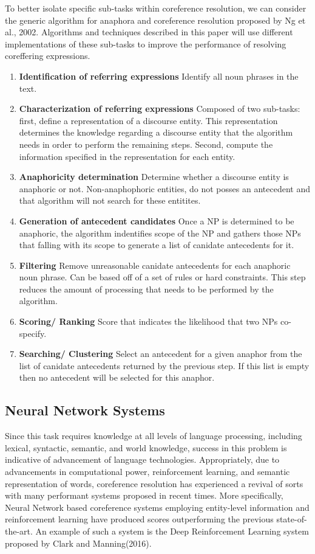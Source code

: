 \documentclass[11pt]{article}
\begin{document}
To better isolate specific sub-tasks within coreference resolution, we can consider the generic algorithm for anaphora and coreference resolution proposed by Ng et al., 2002. Algorithms and techniques described in this paper will use different implementations of these sub-tasks to improve the performance of resolving coreffering expressions. 
\begin{enumerate}
\item \textbf{Identification of referring expressions} Identify all noun phrases in the text. 
\item \textbf{Characterization of referring expressions} Composed of two sub-tasks: first, define a representation of a discourse entity. This representation determines the knowledge regarding a discourse entity that the algorithm needs in order to perform the remaining steps. Second, compute the information specified in the representation for each entity. 
\item \textbf{Anaphoricity determination} Determine whether a discourse entity is anaphoric or not. Non-anaphophoric entities, do not posses an antecedent and that algorithm will not search for these entitites. 
\item \textbf{Generation of antecedent candidates} Once a NP is determined to be anaphoric, the algorithm indentifies scope of the NP and gathers those NPs that falling with its scope to generate a list of canidate antecedents for it.
\item \textbf{Filtering} Remove unreasonable canidate antecedents for each anaphoric noun phrase. Can be based off of a set of rules or hard constraints. This step reduces the amount of processing that needs to be performed by the algorithm.
\item \textbf{Scoring/ Ranking} Score that indicates the likelihood that two NPs co-specify.
\item \textbf{Searching/ Clustering} Select an antecedent for a given anaphor from the list of canidate antecedents returned by the previous step. If this list is empty then no antecedent will be selected for this anaphor. 
\end{enumerate}


\subsection{Neural Network Systems}
Since this task requires knowledge at all levels of language processing, including lexical, syntactic, semantic, and world knowledge, success in this problem is indicative of advancement of language technologies. Appropriately, due to advancements in computational power, reinforcement learning, and semantic representation of words, coreference resolution has experienced a revival of sorts with many performant systems proposed in recent times. More specifically, Neural Network based coreference systems employing entity-level information and reinforcement learning have produced scores outperforming the previous state-of-the-art. An example of such a system is the Deep Reinforcement Learning system  proposed by Clark and Manning(2016). \\
\end{document}
